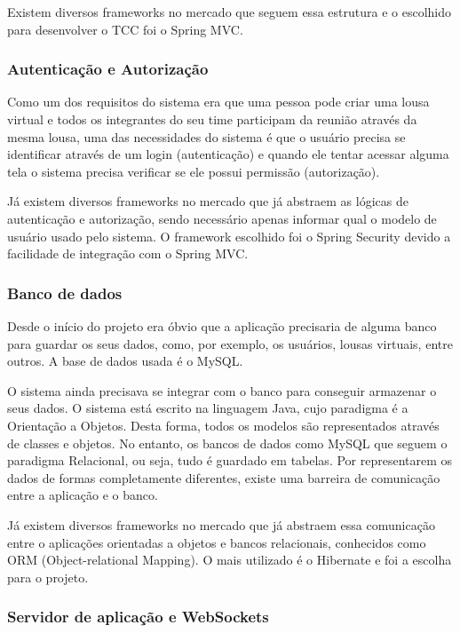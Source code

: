 Existem diversos frameworks no mercado que seguem essa estrutura e o escolhido para desenvolver o TCC foi o Spring MVC.

\subsubsection*{Autenticação e Autorização}

Como um dos requisitos do sistema era que uma pessoa pode criar uma lousa virtual e todos os integrantes do seu time participam da reunião através da mesma lousa, uma das necessidades do sistema é que o usuário precisa se identificar através de um login (autenticação) e quando ele tentar acessar alguma tela o sistema precisa verificar se ele possui permissão (autorização).

Já existem diversos frameworks no mercado que já abstraem as lógicas de autenticação e autorização, sendo necessário apenas informar qual o modelo de usuário usado pelo sistema. O framework escolhido foi o Spring Security devido a facilidade de integração com o Spring MVC.

\subsubsection*{Banco de dados}

Desde o início do projeto era óbvio que a aplicação precisaria de alguma banco para guardar os seus dados, como, por exemplo, os usuários, lousas virtuais, entre outros. A base de dados usada é o MySQL.

O sistema ainda precisava se integrar com o banco para conseguir armazenar o seus dados. O sistema está escrito na linguagem Java, cujo paradigma é a Orientação a Objetos. Desta forma, todos os modelos são representados através de classes e objetos. No entanto, os bancos de dados como MySQL que seguem o paradigma Relacional, ou seja, tudo é guardado em tabelas. Por representarem os dados de formas completamente diferentes, existe uma barreira de comunicação entre a aplicação e o banco.

Já existem diversos frameworks no mercado que já abstraem essa comunicação entre o aplicações orientadas a objetos e bancos relacionais, conhecidos como ORM (Object-relational Mapping). O mais utilizado é o Hibernate e foi a escolha para o projeto.

\subsubsection*{Servidor de aplicação e WebSockets}

